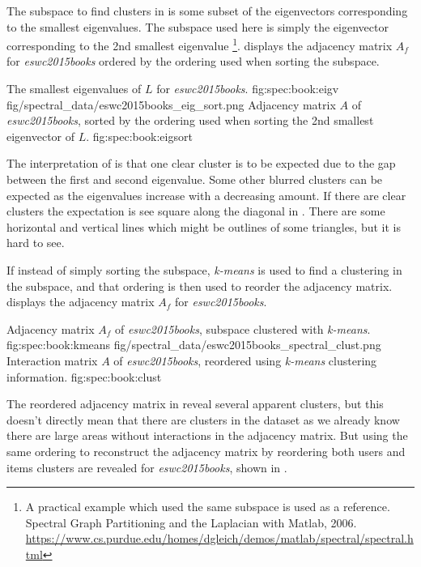 The subspace to find clusters in is some subset of the eigenvectors corresponding to the smallest eigenvalues. The subspace used here is simply the eigenvector corresponding to the 2nd smallest eigenvalue \footnote{A practical example which used the same subspace is used as a reference. \\
Spectral Graph Partitioning and the Laplacian with Matlab, 2006. \\
\url{https://www.cs.purdue.edu/homes/dgleich/demos/matlab/spectral/spectral.html}
}.
 displays the adjacency matrix $A_f$ for \textit{eswc2015books} ordered by the ordering used when sorting the subspace. 

\FloatBarrier

{The smallest eigenvalues of $L$ for \textit{eswc2015books}.}
{fig:spec:book:eigv}
{fig/spectral_data/eswc2015books_eig_sort.png}
{Adjacency matrix $A$ of \textit{eswc2015books}, sorted by the ordering used when sorting the 2nd smallest eigenvector of $L$.}
{fig:spec:book:eigsort}

The interpretation of  is that one clear cluster is to be expected due to the gap between the first and second eigenvalue. Some other blurred clusters can be expected as the eigenvalues increase with a decreasing amount. If there are clear clusters the expectation is see square along the diagonal in . There are some horizontal and vertical lines which might be outlines of some triangles, but it is hard to see.

If instead of simply sorting the subspace, \textit{k-means} is used to find a clustering in the subspace, and that ordering is then used to reorder the adjacency matrix.  displays the adjacency matrix $A_f$ for \textit{eswc2015books}. 

\FloatBarrier

{Adjacency matrix $A_f$ of \textit{eswc2015books}, subspace clustered with \textit{k-means}.}
{fig:spec:book:kmeans}
{fig/spectral_data/eswc2015books_spectral_clust.png}
{Interaction matrix $A$ of \textit{eswc2015books}, reordered using \textit{k-means} clustering information.}
{fig:spec:book:clust}

\FloatBarrier

The reordered adjacency matrix in  reveal several apparent clusters, but this doesn't directly mean that there are clusters in the dataset as we already know there are large areas without interactions in the adjacency matrix. But using the same ordering to reconstruct the adjacency matrix by reordering both users and items clusters are revealed for \textit{eswc2015books}, shown in .

